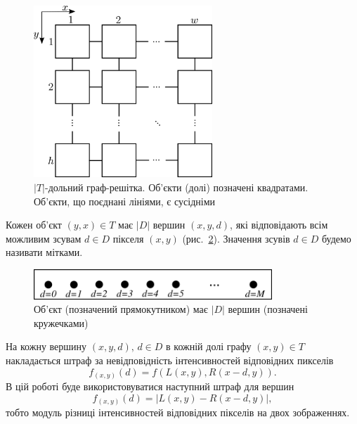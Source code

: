 \begin{figure}[h]
  \centering
  \includegraphics[width=0.6\textwidth]{images/grid_graph_pixels}
  \caption{$\left|T \right|$-дольний граф-решітка.
           Об'єкти (долі) позначені квадратами.
           Об'єкти, що поєднані лініями, є сусідніми}
  \label{fig:grid:graph:pixels}
\end{figure}


Кожен об'єкт $\left(y, x \right) \in T$ має $\left| D \right| $ вершин
$ \left( x, y, d \right)$,
які відповідають всім можливим зсувам $d \in D$ пікселя $\left(x, y \right)$
(рис.~\ref{fig:object:vertices}).
Значення зсувів $d \in D$ будемо називати мітками.

\begin{figure}[h]
  \centering
  \includegraphics[width=0.8\textwidth]{images/object_with_vertices}
  \caption{Об'єкт (позначений прямокутником) має $\left| D \right|$ вершин
           (позначені кружечками)}
  \label{fig:object:vertices}
\end{figure}

На кожну вершину $\left(x, y, d \right), \, d \in D$ в кожній долі графу
$\left(x, y \right) \in T$
накладається штраф за невідповідність інтенсивностей відповідних пикселів
\begin{equation} \label{penalty:vertex}
    f_{\left(x, y \right)} \left(d \right) =
    f \left(
        L \left(x, y\right),
        R \left(x - d, y \right)
    \right).
\end{equation}
В цій роботі буде використовуватися наступний штраф для вершин
\begin{equation*}
    f_{\left(x, y \right)} \left( d \right) =
        \left| L \left(x, y \right) - R \left( x - d, y \right) \right|,
\end{equation*}
тобто модуль різниці інтенсивностей відповідних пікселів на двох зображеннях.

